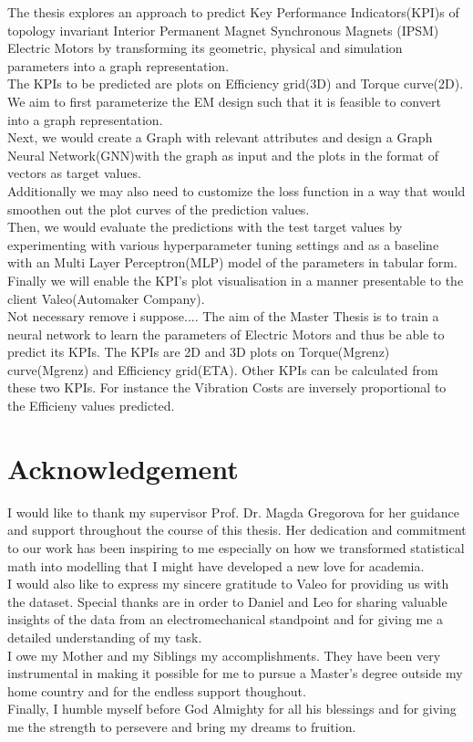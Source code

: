 \documentclass{report} %
\begin{document}
The thesis explores an approach to predict Key Performance Indicators(KPI)s of topology invariant Interior Permanent Magnet Synchronous Magnets (IPSM) Electric Motors by transforming its geometric, physical and simulation parameters into a graph representation. \\
The KPIs to be predicted are plots on Efficiency grid(3D) and Torque curve(2D).\\
We aim to first parameterize the EM design such that it is feasible to convert into a graph representation. \\
Next, we would create a Graph with relevant attributes and design a Graph Neural Network(GNN)with the graph as input and the plots in the format of vectors as target values.\\
Additionally we may also need to customize the loss function in a way that would smoothen out the plot curves of the prediction values.\\
Then, we would evaluate the predictions with the test target values by experimenting with various hyperparameter tuning settings and as a baseline with an Multi Layer Perceptron(MLP) model of the parameters in tabular form.\\
Finally we will enable the KPI's plot visualisation in a manner presentable to the client Valeo(Automaker Company).\\
Not necessary remove i suppose....
The aim of the Master Thesis is to train a neural network to learn the parameters of Electric Motors and thus be able to predict its KPIs.
The KPIs are 2D and 3D plots on Torque(Mgrenz) curve(Mgrenz) and Efficiency grid(ETA). Other KPIs can be calculated from these two KPIs.
For instance the Vibration Costs are inversely proportional to the Efficieny values predicted. 


\newpage 

\newpage 

\chapter*{Acknowledgement}
I would like to thank my supervisor Prof. Dr. Magda Gregorova for her guidance and support throughout the course of this thesis.
Her dedication and commitment to our work has been inspiring to me especially on how we transformed statistical math into modelling that I might have developed a new love for academia. \\
I would also like to express my sincere gratitude to Valeo for providing us with the dataset.
Special thanks are in order to Daniel and Leo for sharing valuable insights of the data from an electromechanical standpoint and for giving me a detailed understanding of my task. \\
I owe my Mother and my Siblings my accomplishments. They have been very instrumental in making it possible for me to pursue a Master's degree outside my home country and for the endless support thoughout.\\
Finally, I humble myself before God Almighty for all his blessings and for giving me the strength to persevere and bring my dreams to fruition.\\
\end{document}
